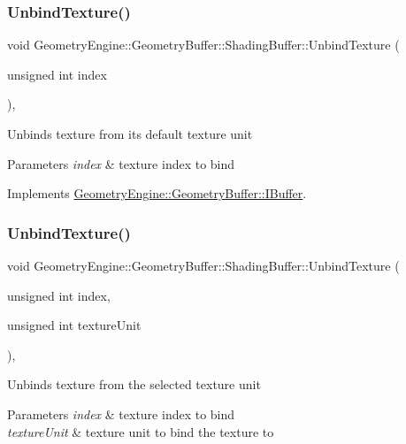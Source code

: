 \subsubsection{\texorpdfstring{UnbindTexture()}{UnbindTexture()}\hspace{0.1cm}{\footnotesize\ttfamily [1/4]}}
{\footnotesize\ttfamily void Geometry\+Engine\+::\+Geometry\+Buffer\+::\+Shading\+Buffer\+::\+Unbind\+Texture (\begin{DoxyParamCaption}\item[{unsigned int}]{index }\end{DoxyParamCaption})\hspace{0.3cm}{\ttfamily [override]}, {\ttfamily [virtual]}}

Unbinds texture from its default texture unit 
\begin{DoxyParams}{Parameters}
{\em index} & texture index to bind \\
\hline
\end{DoxyParams}


Implements \mbox{\hyperlink{class_geometry_engine_1_1_geometry_buffer_1_1_i_buffer_a6130240d58d277cb9e897dfd1924613e}{Geometry\+Engine\+::\+Geometry\+Buffer\+::\+I\+Buffer}}.

\mbox{\label{class_geometry_engine_1_1_geometry_buffer_1_1_shading_buffer_aa1731f2f7848509ac5c04fc417286454}} 
\subsubsection{\texorpdfstring{UnbindTexture()}{UnbindTexture()}\hspace{0.1cm}{\footnotesize\ttfamily [2/4]}}
{\footnotesize\ttfamily void Geometry\+Engine\+::\+Geometry\+Buffer\+::\+Shading\+Buffer\+::\+Unbind\+Texture (\begin{DoxyParamCaption}\item[{unsigned int}]{index,  }\item[{unsigned int}]{texture\+Unit }\end{DoxyParamCaption})\hspace{0.3cm}{\ttfamily [override]}, {\ttfamily [virtual]}}

Unbinds texture from the selected texture unit 
\begin{DoxyParams}{Parameters}
{\em index} & texture index to bind \\
\hline
{\em texture\+Unit} & texture unit to bind the texture to \\
\hline
\end{DoxyParams}



